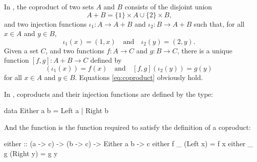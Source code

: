 \begin{example}


  \label{ex:coproduct-set}

  \index{\set}


  In \set, the coproduct of two sets $A$ and $B$ consists of the
  disjoint union
  \begin{equation}
    A + B = \{1\} \times A \cup \{2\} \times B
    \text{,}
  \end{equation}
  and two injection functions $\iota_{1}: A \to A + B$ and $\iota_{2}:
  B \to A + B$ such that, for all $x \in A$ and $y \in B$,
  \begin{equation}
    \iota_{1}(x) = (1,x)
    \quad
    \text{and}
    \quad
    \iota_{2}(y) = (2,y)
    \text{.}
  \end{equation}
  Given a set $C$, and two functions $f: A \to C$ and $g: B \to C$,
  there is a unique function $[f,g]: A + B \to C$ defined by
  \begin{equation}
    [f,g](\iota_{1}(x)) = f(x)
    \quad
    \text{and}
    \quad
    [f,g](\iota_{2}(y)) = g(y)
  \end{equation}
  for all $x \in A$ and $y \in B$. Equations \eqref{eq:coproduct}
  obviously hold.

\end{example}

\begin{example}
  \label{ex:coproduct-haskell}

  \index{\hask}


  In \hask, coproducts and their injection functions are defined by
  the  type:
  \begin{codehaskell}
data Either a b = Left a | Right b
  \end{codehaskell}
  And the  function is the function required to
  satisfy the definition of a coproduct:
  \begin{codehaskell}
either :: (a -> c) -> (b -> c) -> Either a b -> c
either f _ (Left x)  = f x
either _ g (Right y) = g y
  \end{codehaskell}

\end{example}

